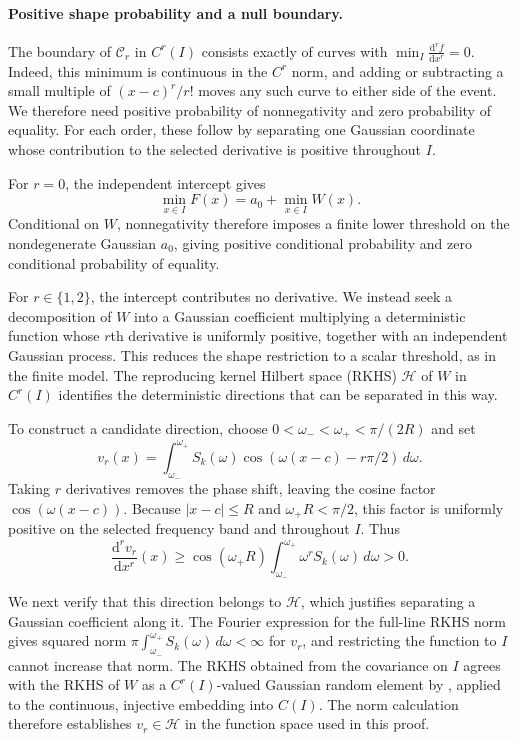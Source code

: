 \begin{proofEnd}
\paragraph{Positive shape probability and a null boundary.}
The boundary of $\mathcal C_r$ in $C^r(I)$ consists exactly of curves
with $\min_I\frac{\mathrm{d}^rf}{\mathrm{d}x^r}=0$. Indeed, this minimum is continuous
in the $C^r$ norm, and adding or subtracting a small multiple of
$(x-c)^r/r!$ moves any such curve to either side of the event.
We therefore need positive probability of nonnegativity and zero
probability of equality. For each order, these follow by separating
one Gaussian coordinate whose contribution to the selected derivative
is positive throughout $I$.

For $r=0$, the independent intercept gives
\[
 \min_{x\in I}F(x)=a_0+\min_{x\in I}W(x).
\]
Conditional on $W$, nonnegativity therefore imposes a finite lower
threshold on the nondegenerate Gaussian $a_0$, giving positive
conditional probability and zero conditional probability of equality.

For $r\in\{1,2\}$, the intercept contributes no derivative. We instead
seek a decomposition of $W$ into a Gaussian coefficient multiplying
a deterministic function whose $r$th derivative is uniformly positive,
together with an independent Gaussian process. This reduces the shape
restriction to a scalar threshold, as in the finite model.
The reproducing kernel Hilbert space (RKHS) $\mathcal H$ of $W$ in
$C^r(I)$ identifies the deterministic directions that can be separated
in this way.

To construct a candidate direction, choose
$0<\omega_-<\omega_+<\pi/(2R)$ and set
\[
 v_r(x)=\int_{\omega_-}^{\omega_+}S_k(\omega)
             \cos(\omega(x-c)-r\pi/2)\,d\omega.
\]
Taking $r$ derivatives removes the phase shift, leaving the cosine
factor $\cos(\omega(x-c))$. Because $|x-c|\leq R$ and
$\omega_+R<\pi/2$, this factor is uniformly positive on the selected
frequency band and throughout $I$. Thus
\[
 \frac{\mathrm{d}^rv_r}{\mathrm{d}x^r}(x)\geq
 \cos(\omega_+R)\int_{\omega_-}^{\omega_+}\omega^rS_k(\omega)\,d\omega>0.
\]

We next verify that this direction belongs to $\mathcal H$, which
justifies separating a Gaussian coefficient along it.
The Fourier expression for the full-line RKHS norm gives squared norm
$\pi\int_{\omega_-}^{\omega_+}S_k(\omega)\,d\omega<\infty$ for $v_r$,
and restricting the function to $I$ cannot increase that norm.
The RKHS obtained from the covariance on $I$ agrees with the RKHS
of $W$ as a $C^r(I)$-valued Gaussian random element by
\citet[Lemma 8.1]{vdv2008rkhs}, applied to the continuous, injective
embedding into $C(I)$. The norm calculation therefore establishes
$v_r\in\mathcal H$ in the function space used in this proof.


\end{proofEnd}
